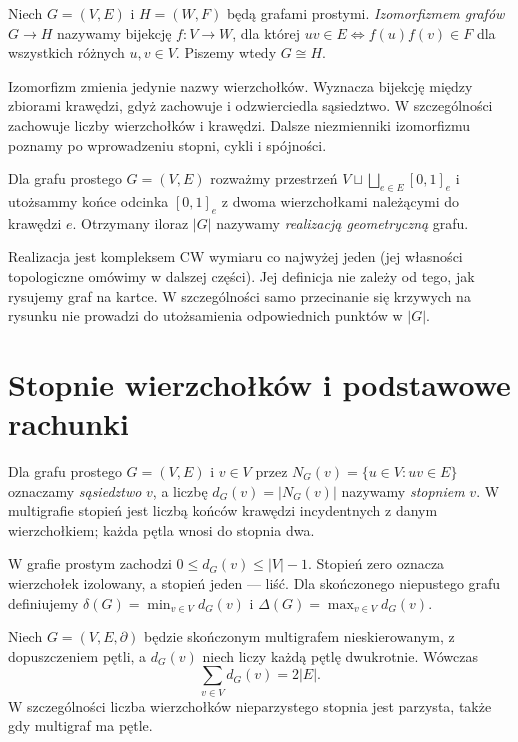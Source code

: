 \begin{definicja}[Izomorfizm]
Niech $G=(V,E)$ i $H=(W,F)$ będą grafami prostymi.
\emph{Izomorfizmem grafów} $G\to H$ nazywamy bijekcję
$f:V\to W$, dla której
$uv\in E\iff f(u)f(v)\in F$ dla wszystkich różnych $u,v\in V$.
Piszemy wtedy $G\cong H$.
\end{definicja}

Izomorfizm zmienia jedynie nazwy wierzchołków. Wyznacza
bijekcję między zbiorami krawędzi, gdyż zachowuje i odzwierciedla
sąsiedztwo. W szczególności zachowuje liczby wierzchołków
i krawędzi. Dalsze niezmienniki izomorfizmu poznamy po
wprowadzeniu stopni, cykli i spójności.

\begin{definicja}
Dla grafu prostego $G=(V,E)$ rozważmy przestrzeń
$V\sqcup\bigsqcup_{e\in E}[0,1]_e$ i utożsammy
końce odcinka $[0,1]_e$ z dwoma wierzchołkami
należącymi do krawędzi $e$. Otrzymany iloraz
$|G|$ nazywamy \emph{realizacją geometryczną} grafu.
\end{definicja}

Realizacja jest kompleksem CW wymiaru co najwyżej jeden
(jej własności topologiczne omówimy w dalszej części). Jej definicja nie
zależy od tego, jak rysujemy graf na kartce. W szczególności
samo przecinanie się krzywych na rysunku nie prowadzi do
utożsamienia odpowiednich punktów w $|G|$.

\section{Stopnie wierzchołków i podstawowe rachunki}
\label{sec:tg-stopnie}

\begin{definicja}[Stopień]
Dla grafu prostego $G=(V,E)$ i $v\in V$ przez
$N_G(v)=\{u\in V:uv\in E\}$ oznaczamy
\emph{sąsiedztwo} $v$, a liczbę $d_G(v)=|N_G(v)|$
nazywamy \emph{stopniem} $v$. W multigrafie stopień
jest liczbą końców krawędzi incydentnych z danym
wierzchołkiem; każda pętla wnosi do stopnia dwa.
\end{definicja}

W grafie prostym zachodzi $0\le d_G(v)\le |V|-1$.
Stopień zero oznacza wierzchołek izolowany, a stopień jeden
--- liść. Dla skończonego niepustego grafu definiujemy
$\delta(G)=\min_{v\in V}d_G(v)$ i
$\Delta(G)=\max_{v\in V}d_G(v)$.

\begin{twierdzenie}
Niech $G=(V,E,\partial)$ będzie skończonym multigrafem
nieskierowanym, z dopuszczeniem pętli, a $d_G(v)$
niech liczy każdą pętlę dwukrotnie. Wówczas
\[
\sum_{v\in V}d_G(v)=2|E|.
\]
W szczególności liczba wierzchołków nieparzystego
stopnia jest parzysta, także gdy multigraf ma pętle.
\end{twierdzenie}

